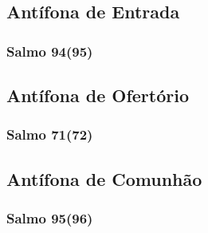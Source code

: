 \subsection{Antífona de Entrada}
\nopagebreak


\subsubsection{Salmo 94(95)}
\nopagebreak


\AllowPageFlush

\subsection{Antífona de Ofertório}
\nopagebreak


\subsubsection{Salmo 71(72)}
\nopagebreak


\subsection{Antífona de Comunhão}
\nopagebreak


\subsubsection{Salmo 95(96)}
\nopagebreak
